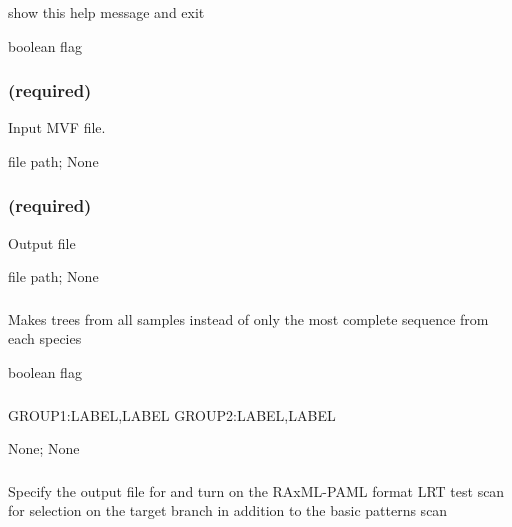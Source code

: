 \documentclass[letterpaper,11pt,english]{sphinxmanual}
\begin{document}
\subsubsection{}
\label{\detokenize{prog_desc:id100}}
 show this help message and exit

 boolean flag


\subsubsection{ (required)}
\label{\detokenize{prog_desc:id101}}
 Input MVF file.

 file path;  None


\subsubsection{ (required)}
\label{\detokenize{prog_desc:id102}}
 Output file

 file path;  None


\subsubsection{}
\label{\detokenize{prog_desc:all-sample-trees-allsampletrees}}
 Makes trees from all samples instead of only the most complete sequence from each species

 boolean flag


\subsubsection{}
\label{\detokenize{prog_desc:allele-groups-allelegroups}}
 GROUP1:LABEL,LABEL GROUP2:LABEL,LABEL

 None;  None


\subsubsection{}
\label{\detokenize{prog_desc:branch-lrt-branchlrt}}
 Specify the output file for and turn on the RAxML-PAML format LRT test scan for selection on the target branch in addition to the basic patterns scan
\end{document}
